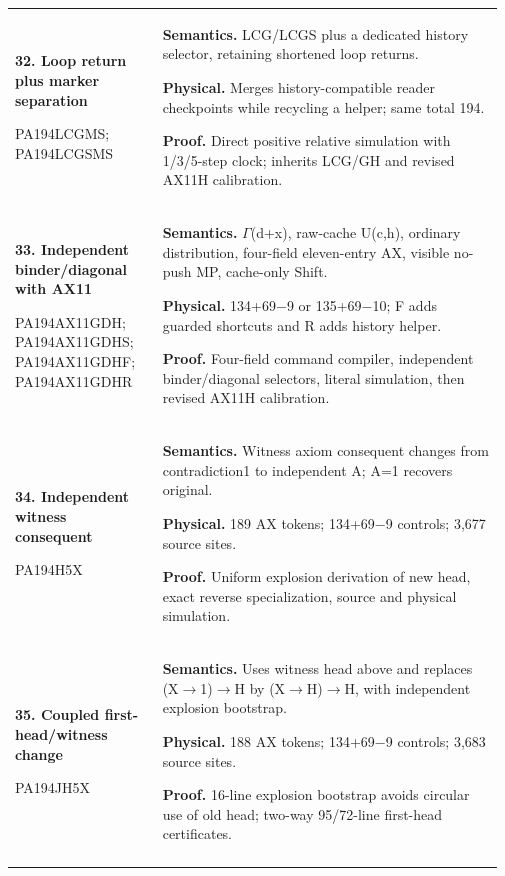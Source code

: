 \begin{longtable}{@{}>{\raggedright\arraybackslash}p{0.295\linewidth}>{\raggedright\arraybackslash}p{0.675\linewidth}@{}}
\textbf{32. Loop return plus marker separation}\par PA194LCGMS; PA194LCGSMS & \textbf{Semantics.} LCG/LCGS plus a dedicated history selector, retaining shortened loop returns.\par\textbf{Physical.} Merges history-compatible reader checkpoints while recycling a helper; same total 194.\par\textbf{Proof.} Direct positive relative simulation with 1/3/5-step clock; inherits LCG/GH and revised AX11H calibration.\\\addlinespace[6pt]
\textbf{33. Independent binder/diagonal with AX11}\par PA194AX11GDH; PA194AX11GDHS; PA194AX11GDHF; PA194AX11GDHR & \textbf{Semantics.} \(\Gamma\)(d+x), raw-cache U(c,h), ordinary distribution, four-field eleven-entry AX, visible no-push MP, cache-only Shift.\par\textbf{Physical.} 134+69\(-\)9 or 135+69\(-\)10; F adds guarded shortcuts and R adds history helper.\par\textbf{Proof.} Four-field command compiler, independent binder/diagonal selectors, literal simulation, then revised AX11H calibration.\\\addlinespace[6pt]
\textbf{34. Independent witness consequent}\par PA194H5X & \textbf{Semantics.} Witness axiom consequent changes from contradiction1 to independent A; A=1 recovers original.\par\textbf{Physical.} 189 AX tokens; 134+69\(-\)9 controls; 3,677 source sites.\par\textbf{Proof.} Uniform explosion derivation of new head, exact reverse specialization, source and physical simulation.\\\addlinespace[6pt]
\textbf{35. Coupled first-head/witness change}\par PA194JH5X & \textbf{Semantics.} Uses witness head above and replaces (X\(\to\)1)\(\to\)H by (X\(\to\)H)\(\to\)H, with independent explosion bootstrap.\par\textbf{Physical.} 188 AX tokens; 134+69\(-\)9 controls; 3,683 source sites.\par\textbf{Proof.} 16-line explosion bootstrap avoids circular use of old head; two-way 95/72-line first-head certificates.\\\addlinespace[6pt]
\end{longtable}
\normalsize
